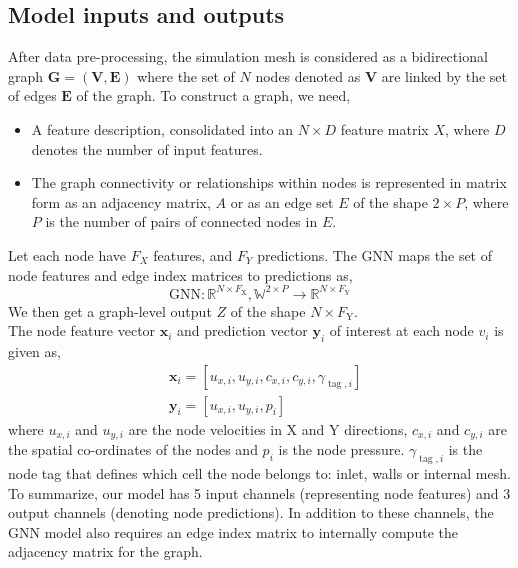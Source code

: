 \subsection{Model inputs and outputs}
After data pre-processing, the simulation mesh is considered as a bidirectional graph $\mathbf{G} = (\mathbf{V}, \mathbf{E})$ where the set of $N$ nodes denoted as $\mathbf{V}$ are linked by the set of edges $\mathbf{E}$ of the graph. To construct a graph, we need,
\begin{itemize}
\item A feature description, consolidated into an $N \times D$ feature matrix $X$, where $D$ denotes the number of input features.
\item The graph connectivity or relationships within nodes is represented in matrix form as an adjacency matrix, $A$ or as an edge set $E$ of the shape $2 \times P$, where $P$ is the number of pairs of connected nodes in $E$.
\end{itemize}
Let each node have $F_X$ features, and $F_Y$ predictions. The GNN maps the set of node features and edge index matrices to predictions as, 
\begin{equation}
    \mathrm{GNN}: \mathbb{R}^{{N} \times F_{\mathrm{X}}}, \mathbb{W}^{2 \times P} \rightarrow \mathbb{R}^{{N} \times F_{\mathrm{Y}}}
    \end{equation}
We then get a graph-level output $Z$ of the shape ${N} \times F_{\mathrm{Y}}$. \\
The node feature vector $\mathbf{x}_i$ and prediction vector $\mathbf{y}_i$ of interest at each node $v_i$ is given as,
\begin{equation}
    \begin{aligned}
    & \mathbf{x}_i=\left[u_{x, i}, u_{y, i},c_{x, i}, c_{y, i}, \gamma_{\operatorname{tag}, i}\right] \\
    & \mathbf{y}_i=\left[u_{x, i}, u_{y, i}, p_i\right]
    \end{aligned}
\end{equation}
where $u_{x, i}$ and $u_{y, i}$ are the node velocities in X and Y directions, $c_{x, i}$ and $c_{y, i}$ are the spatial co-ordinates of the nodes and $p_i$ is the node pressure. $\gamma_{\operatorname{tag}, i}$ is the node tag that defines which cell the node belongs to: inlet, walls or internal mesh. To summarize, our model has 5 input channels (representing node features) and 3 output channels (denoting node predictions). In addition to these channels, the GNN model also requires an edge index matrix to internally compute the adjacency matrix for the graph. 

